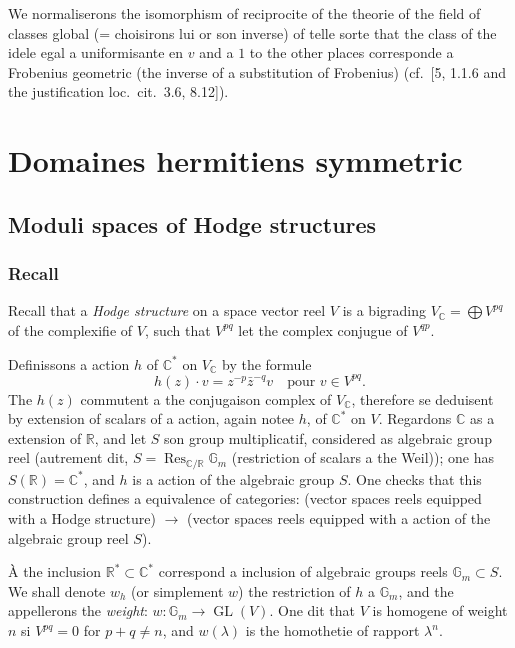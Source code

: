 \documentclass[12pt,a4paper]{article}
\theoremstyle{plain}
\theoremstyle{definition}
\theoremstyle{remark}
\DeclareMathOperator{\GL}{GL}
\DeclareMathOperator{\Res}{Res}
\newcommand{\RR}{\mathbb{R}}
\newcommand{\CC}{\mathbb{C}}
\newcommand{\Gm}{\mathbb{G}}
\begin{document}
We normaliserons the isomorphism of reciprocite of the theorie of the field of classes global (= choisirons lui or son inverse) of telle sorte that the class of the idele egal a uniformisante en $v$ and a $1$ to the other places corresponde a Frobenius geometric (the inverse of a substitution of Frobenius) (cf.~[5, 1.1.6 and the justification loc.~cit.~3.6, 8.12]).

\section{Domaines hermitiens symmetric}

\subsection{Moduli spaces of Hodge structures}

\subsubsection{Recall}

Recall that a \textit{Hodge structure} on a space vector reel $V$ is a bigrading $V_{\CC} = \bigoplus V^{pq}$ of the complexifie of $V$, such that $V^{pq}$ let the complex conjugue of $V^{qp}$.

Definissons a action $h$ of $\CC^*$ on $V_{\CC}$ by the formule
\begin{equation}\label{eq:1.1.1.1}
h(z)\cdot v = z^{-p}\bar{z}^{-q}v \quad \text{pour } v \in V^{pq}.
\end{equation}
The $h(z)$ commutent a the conjugaison complex of $V_{\CC}$, therefore se deduisent by extension of scalars of a action, again notee $h$, of $\CC^*$ on $V$. Regardons $\CC$ as a extension of $\RR$, and let $S$ son group multiplicatif, considered as algebraic group reel (autrement dit, $S = \Res_{\CC/\RR}\Gm_m$ (restriction of scalars a the Weil)); one has $S(\RR) = \CC^*$, and $h$ is a action of the algebraic group $S$. One checks that this construction defines a equivalence of categories: (vector spaces reels equipped with a Hodge structure) $\to$ (vector spaces reels equipped with a action of the algebraic group reel $S$).

\`A the inclusion $\RR^* \subset \CC^*$ correspond a inclusion of algebraic groups reels $\Gm_m \subset S$. We shall denote $w_h$ (or simplement $w$) the restriction of $h$ a $\Gm_m$, and the appellerons the \textit{weight}: $w:\Gm_m \to \GL(V)$. One dit that $V$ is homogene of weight $n$ si $V^{pq} = 0$ for $p+q \neq n$, and $w(\lambda)$ is the homothetie of rapport $\lambda^n$.
\end{document}
